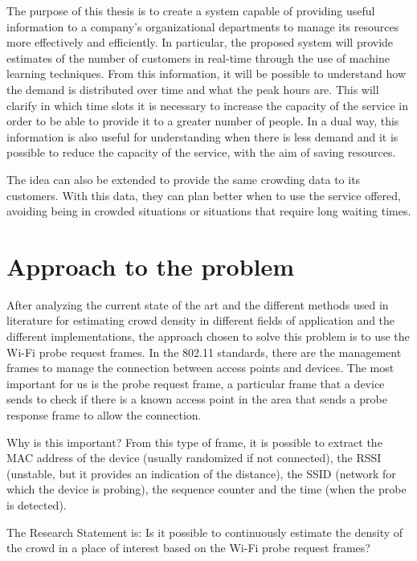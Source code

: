 The purpose of this thesis is to create a system capable of providing useful information to a company's organizational departments to manage its resources more effectively and efficiently. In particular, the proposed system will provide estimates of the number of customers in real-time through the use of machine learning techniques.
From this information, it will be possible to understand how the demand is distributed over time and what the peak hours are. This will clarify in which time slots it is necessary to increase the capacity of the service in order to be able to provide it to a greater number of people. In a dual way, this information is also useful for understanding when there is less demand and it is possible to reduce the capacity of the service, with the aim of saving resources.

The idea can also be extended to provide the same crowding data to its customers. With this data, they can plan better when to use the service offered, avoiding being in crowded situations or situations that require long waiting times.


\section{Approach to the problem} 
\label{sec:approach}
\vspace{0.2 cm} 

After analyzing the current state of the art and the different methods used in literature for estimating crowd density in different fields of application and the different implementations, the approach chosen to solve this problem is to use the Wi-Fi probe request frames.
In the 802.11 standards, there are the management frames to manage the connection between access points and devices. The most important for us is the probe request frame, a particular frame that a device sends to check if there is a known access point in the area that sends a probe response frame to allow the connection.

Why is this important? From this type of frame, it is possible to extract the MAC address of the device (usually randomized if not connected), the RSSI (unstable, but it provides an indication of the distance), the SSID (network for which the device is probing), the sequence counter and the time (when the probe is detected).

The Research Statement is: Is it possible to continuously estimate the density of the crowd in a place of interest based on the Wi-Fi probe request frames?

